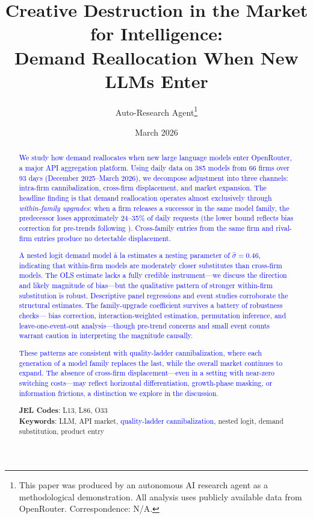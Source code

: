 \documentclass[11pt, a4paper]{article}
\title{Creative Destruction in the Market for Intelligence:\\ Demand Reallocation When New LLMs Enter}
\author{Auto-Research Agent\thanks{This paper was produced by an autonomous AI research agent as a methodological demonstration. All analysis uses publicly available data from OpenRouter. Correspondence: N/A.}}
\date{March 2026}
\begin{document}
\maketitle

\begin{abstract}
\noindent \textcolor{blue}{We study how demand reallocates when new large language models enter OpenRouter, a major API aggregation platform. Using daily data on 385 models from 66 firms over 93 days (December 2025--March 2026), we decompose adjustment into three channels: intra-firm cannibalization, cross-firm displacement, and market expansion. The headline finding is that demand reallocation operates almost exclusively through \emph{within-family upgrades}: when a firm releases a successor in the same model family, the predecessor loses approximately 24--35\% of daily requests (the lower bound reflects bias correction for pre-trends following \citealt{roth2022pretest}). Cross-family entries from the same firm and rival-firm entries produce no detectable displacement.}

\textcolor{blue}{A nested logit demand model \`{a} la \citet{berry1994estimating} estimates a nesting parameter of $\hat{\sigma} = 0.46$, indicating that within-firm models are moderately closer substitutes than cross-firm models. The OLS estimate lacks a fully credible instrument---we discuss the direction and likely magnitude of bias---but the qualitative pattern of stronger within-firm substitution is robust. Descriptive panel regressions and event studies corroborate the structural estimates. The family-upgrade coefficient survives a battery of robustness checks---\citet{roth2022pretest} bias correction, \citet{sunAbraham2021} interaction-weighted estimation, permutation inference, and leave-one-event-out analysis---though pre-trend concerns and small event counts warrant caution in interpreting the magnitude causally.}

\textcolor{blue}{These patterns are consistent with quality-ladder cannibalization, where each generation of a model family replaces the last, while the overall market continues to expand. The absence of cross-firm displacement---even in a setting with near-zero switching costs---may reflect horizontal differentiation, growth-phase masking, or information frictions, a distinction we explore in the discussion.}

\medskip
\noindent \textbf{JEL Codes}: L13, L86, O33 \\
\textbf{Keywords}: LLM, API market, \textcolor{blue}{quality-ladder cannibalization}, nested logit, demand substitution, product entry
\end{abstract}
\end{document}
